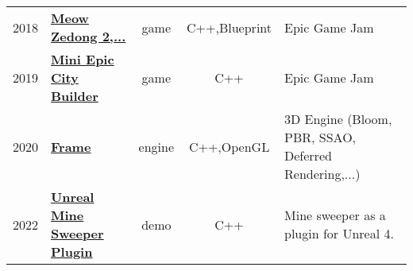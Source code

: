 \documentclass[a4paper]{deedy-resume} %
\begin{document}
\begin{tabular}{rlccl}
2018 & \textbf{\href{https://www.epicgamejam.com/games/meow-zedong-great-helmsman-future-chairman-urinal-leap-forward}{Meow Zedong 2,...}} & 
	game & C++,Blueprint & Epic Game Jam \\
2019 & \textbf{\href{https://www.epicgamejam.com/games/mini-epic-city-builder}{Mini Epic City Builder}} &
	game & C++ & Epic Game Jam \\
2020 & \textbf{\href{https://www.github.com/anirul/Frame}{Frame}} & 
	engine & C++,OpenGL & 3D Engine (Bloom, PBR, SSAO, Deferred Rendering,...) \\
2022 & \textbf{\href{https://github.com/anirul/UnrealMineSweeperTool}{Unreal Mine Sweeper Plugin}} &
	demo & C++ & Mine sweeper as a plugin for Unreal 4.
\end{tabular}










\end{document}
